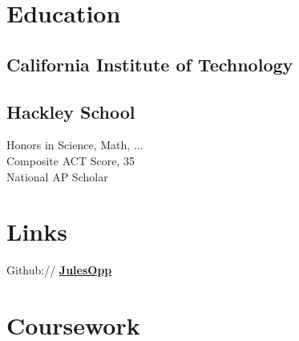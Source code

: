 \documentclass[letterpaper]{deedy-resume} %
\begin{document}
\begin{minipage}[t]{0.39\textwidth} %


\section{Education} 

\subsection{California Institute of \newline Technology}


\sectionspace %

\subsection{Hackley School}

Honors in Science, Math, ... \\
Composite ACT Score, 35 \\
National AP Scholar \\


\sectionspace %



\section{Links} 

Github:// \href{https://github.com/JulesOpp}{\bf JulesOpp} \\

\sectionspace %


\section{Coursework}


\end{minipage}
\end{document}

